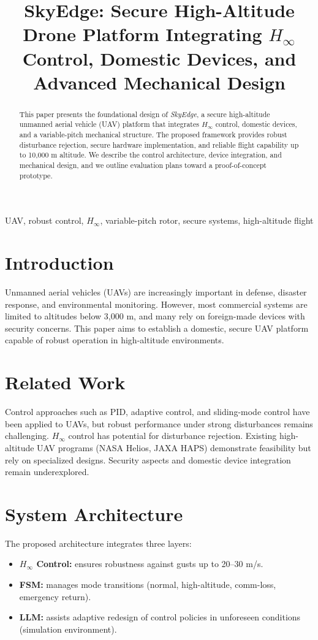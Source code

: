 \documentclass[conference]{IEEEtran}
\title{SkyEdge: Secure High-Altitude Drone Platform Integrating $H_\infty$ Control, Domestic Devices, and Advanced Mechanical Design}
\author{
\IEEEauthorblockN{Shinichi Samizo}
\IEEEauthorblockA{Independent Semiconductor Researcher \\
Project Design Hub, Samizo-AITL \\
\textit{Email:} \href{mailto:shin3t72@gmail.com}{shin3t72@gmail.com} \\
\textit{GitHub:} \href{https://github.com/Samizo-AITL}{Samizo-AITL}}
}
\begin{document}
\maketitle

\begin{abstract}
This paper presents the foundational design of \emph{SkyEdge}, 
a secure high-altitude unmanned aerial vehicle (UAV) platform that 
integrates $H_\infty$ control, domestic devices, and a variable-pitch 
mechanical structure. The proposed framework provides robust disturbance 
rejection, secure hardware implementation, and reliable flight capability 
up to 10{,}000 m altitude. We describe the control architecture, device 
integration, and mechanical design, and we outline evaluation plans 
toward a proof-of-concept prototype.
\end{abstract}

\begin{IEEEkeywords}
UAV, robust control, $H_\infty$, variable-pitch rotor, secure systems, high-altitude flight
\end{IEEEkeywords}

\section{Introduction}
Unmanned aerial vehicles (UAVs) are increasingly important in defense, 
disaster response, and environmental monitoring. However, most commercial 
systems are limited to altitudes below 3{,}000 m, and many rely on 
foreign-made devices with security concerns. This paper aims to establish 
a domestic, secure UAV platform capable of robust operation in 
high-altitude environments.

\section{Related Work}
Control approaches such as PID, adaptive control, and sliding-mode 
control have been applied to UAVs, but robust performance under strong 
disturbances remains challenging. $H_\infty$ control has potential for 
disturbance rejection. Existing high-altitude UAV programs (NASA Helios, 
JAXA HAPS) demonstrate feasibility but rely on specialized designs. 
Security aspects and domestic device integration remain underexplored.

\section{System Architecture}
The proposed architecture integrates three layers:
\begin{itemize}
    \item \textbf{$H_\infty$ Control:} ensures robustness against gusts 
    up to 20--30 m/s.
    \item \textbf{FSM:} manages mode transitions (normal, high-altitude, 
    comm-loss, emergency return).
    \item \textbf{LLM:} assists adaptive redesign of control policies in 
    unforeseen conditions (simulation environment).
\end{itemize}
\end{document}
